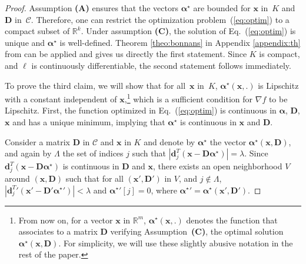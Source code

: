 \documentclass[twoside,11pt]{article}
\def\x{{\mathbf x}}
\def\l{{\ell}}
\def\alphab{{\boldsymbol\alpha}}
\def\D{{\mathbf D}}
\def\d{{\mathbf d}}
\def\C{{\mathcal C}}
\def\d{{\mathbf d}}
\def\Real{{\mathbb R}}
\begin{document}
\begin{proof}
Assumption {\bf (A)} ensures that the vectors $\alphab^\star$ are
bounded for $\x$ in~$K$ and $\D$ in~$\C$. Therefore, one can
restrict the optimization problem~(\ref{eq:optim}) to a
compact subset of $\Real^k$.  Under assumption {\bf (C)}, the solution of
Eq.~(\ref{eq:optim}) is unique and $\alphab^\star$ is
well-defined.  Theorem \ref{theo:bonnans} in Appendix \ref{appendix:th} from
\citet{bonnans} can be applied and gives us
directly the first statement.  Since $K$ is compact, and $\l$ is continuously differentiable, the
second statement follows immediately.

To prove the third claim, we will show that for all~$\x$ in~$K$,
$\alphab^\star(\x,.)$ is Lipschitz with a constant independent of
$\x$,\footnote{ From now on, for a vector $\x$ in $\Real^m$, 
$\alphab^\star(\x,.)$ denotes the function that associates to a matrix
$\D$ verifying Assumption~{\bf (C)}, the optimal solution $\alphab^\star(\x,\D)$.
For simplicity, we will use these slightly abusive
notation in the rest of the paper.}
which is a sufficient condition for $\nabla f$ to be
Lipschitz.  First, the function optimized in Eq.~(\ref{eq:optim}) is continuous
in $\alphab$, $\D$, $\x$ and has a unique minimum, implying that
$\alphab^\star$ is continuous in $\x$ and $\D$.

Consider a matrix $\D$ in $\C$ and $\x$ in $K$ and denote by $\alphab^\star$ the vector $\alphab^\star(\x,\D)$, and
again by $\Lambda$ the set of indices $j$
such that $|\d_j^T(\x-\D\alphab^\star)|=\lambda$.
Since $\d_j^T(\x-\D\alphab^\star)$ is 
continuous in $\D$ and $\x$, there exists an open neighborhood $V$ around $(\x,\D)$ such that
for all $(\x',\D')$ in $V$, and $j \notin \Lambda$, $|{\d_j^T}'(\x'-\D'{\alphab^\star}')| < \lambda$
and ${\alphab^\star}'[j]=0$, where
${\alphab^\star}'=\alphab^\star(\x',\D')$.


\end{proof}
\end{document}

